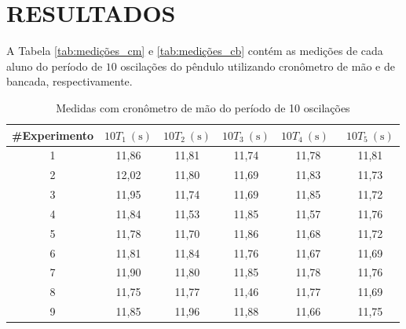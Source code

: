 \documentclass[12pt, a4paper, brazil]{article}
\begin{document}
\section{RESULTADOS}
A Tabela \ref{tab:medições_cm} e \ref{tab:medições_cb}
contém as medições de cada aluno do período de $10$ oscilações do pêndulo utilizando cronômetro de mão e de bancada, respectivamente.
\begin{table}[H]

	\centering
	\caption{Medidas com cronômetro de mão do período de 10 oscilações}
	\begin{tabular}{c c c c c c}
		\hline
		\#Experimento & ${10T_{1}}\ \mathrm{(s)}$ & ${10T_{2}}\ \mathrm{(s)}$ & ${10T_{3}}\ \mathrm{(s)}$ & ${10T_{4}}\ \mathrm{(s)}$\  & ${10T_{5}}\ \mathrm{(s)}$ \\ [0.5ex]
		\hline
		1             & 11,86                     & 11,81                     & 11,74                     & 11,78                       & 11,81                     \\
		2             & 12,02                     & 11,80                     & 11,69                     & 11,83                       & 11,73                     \\
		3             & 11,95                     & 11,74                     & 11,69                     & 11,85                       & 11,72                     \\
		4             & 11,84                     & 11,53                     & 11,85                     & 11,57                       & 11,76                     \\
		5             & 11,78                     & 11,70                     & 11,86                     & 11,68                       & 11,72                     \\
		6             & 11,81                     & 11,84                     & 11,76                     & 11,67                       & 11,69                     \\
		7             & 11,90                     & 11,80                     & 11,85                     & 11,78                       & 11,76                     \\
		8             & 11,75                     & 11,77                     & 11,46                     & 11,77                       & 11,69                     \\
		9             & 11,85                     & 11,96                     & 11,88                     & 11,66                       & 11,75                     \\

\end{tabular}
\end{table}
\end{document}
